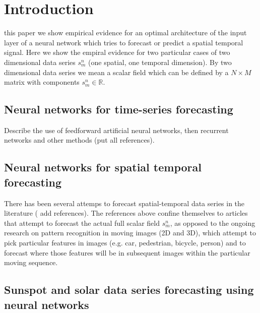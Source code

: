 \documentclass[journal]{IEEEtran}
\begin{document}
\section{Introduction}
% 
% 
% 
% 
 this paper we show empirical evidence for an optimal architecture of the input layer of a neural network which tries
to forecast or predict a spatial temporal signal. Here we show the empiral evidence for two particular cases of 
two dimensional data series $s^n_m$ (one spatial,
one temporal dimension). By two dimensional data series we mean a scalar field which can be
defined by a $N\times M$ matrix with components $s^n_m \in \mathbb{R}$.

\subsection{Neural networks for time-series forecasting}

Describe the use of feedforward artificial neural networks, then recurrent networks and other methods (put all references).

\subsection{Neural networks for spatial temporal forecasting}

There has been several attemps to forecast spatial-temporal data series in the literature ( add references). The references above
confine themselves to articles that attempt to forecast the actual full scalar field  $s^n_m$, as opposed to the ongoing research on
pattern recognition in moving images (2D and 3D), which attempt to pick particular features in images (e.g. car, pedestrian, bicycle,
person) and to forecast where those features will be in subsequent images within the particular moving sequence. 

\subsection{Sunspot and solar data series forecasting using neural networks}
\end{document}

